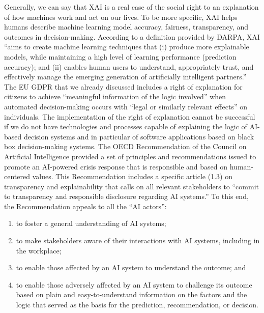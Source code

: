 Generally, we can say that XAI is a real case of the social right to an explanation of how machines work and act on our lives. To be more specific, XAI helps humans describe machine learning model accuracy, fairness, transparency, and outcomes in decision-making. According to a definition provided by DARPA, XAI ``aims to create machine learning techniques that (i) produce more explainable models, while maintaining a high level of learning performance (prediction accuracy); and (ii) enables human users to understand, appropriately trust, and effectively manage the emerging generation of artificially intelligent partners.'' The EU GDPR that we already discussed includes a right of explanation for citizens to achieve ``meaningful information of the logic involved'' when automated decision-making occurs with ``legal or similarly relevant effects'' on individuals. The implementation of the right of explanation cannot be successful if we do not have technologies and processes capable of explaining the logic of AI-based decision systems and in particular of software applications based on black box decision-making systems. The OECD Recommendation of the Council on Artificial Intelligence provided a set of principles and recommendations issued to promote an AI-powered crisis response that is responsible and based on human-centered values. This Recommendation includes a specific article (1.3) on transparency and explainability that calls on all relevant stakeholders to ``commit to transparency and responsible disclosure regarding AI systems.'' To this end, the Recommendation appeals to all the ``AI actors'':

\bgroup
\def\labelenumi{(\arabic{enumi})}
\begin{enumerate}
\item to foster a general understanding of AI systems;

\item to make stakeholders aware of their interactions with AI systems, including in the\vadjust{\vspace*{14pt}\pagebreak} workplace;

\item to enable those affected by an AI system to understand the outcome; and

\item to enable those adversely affected by an AI system to challenge its outcome based on plain and easy-to-understand information on the factors and the logic that served as the basis for the prediction, recommendation, or decision.
\end{enumerate}
\egroup

